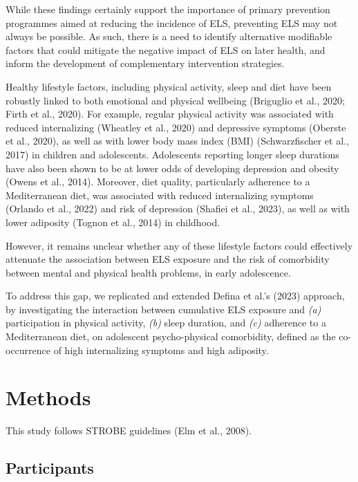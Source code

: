 \documentclass[
  letterpaper,
  DIV=11,
  numbers=noendperiod]{scrreport}
\begin{document}
While these findings certainly support the importance of primary
prevention programmes aimed at reducing the incidence of ELS, preventing
ELS may not always be possible. As such, there is a need to identify
alternative modifiable factors that could mitigate the negative impact
of ELS on later health, and inform the development of complementary
intervention strategies.

Healthy lifestyle factors, including physical activity, sleep and diet
have been robustly linked to both emotional and physical wellbeing
(Briguglio et al., 2020; Firth et al., 2020). For example, regular
physical activity was associated with reduced internalizing (Wheatley et
al., 2020) and depressive symptoms (Oberste et al., 2020), as well as
with lower body mass index (BMI) (Schwarzfischer et al., 2017) in
children and adolescents. Adolescents reporting longer sleep durations
have also been shown to be at lower odds of developing depression and
obesity (Owens et al., 2014). Moreover, diet quality, particularly
adherence to a Mediterranean diet, was associated with reduced
internalizing symptoms (Orlando et al., 2022) and risk of depression
(Shafiei et al., 2023), as well as with lower adiposity (Tognon et al.,
2014) in childhood.

However, it remains unclear whether any of these lifestyle factors could
effectively attenuate the association between ELS exposure and the risk
of comorbidity between mental and physical health problems, in early
adolescence.

To address this gap, we replicated and extended Defina et al.'s (2023)
approach, by investigating the interaction between cumulative ELS
exposure and \emph{(a)} participation in physical activity, \emph{(b)}
sleep duration, and \emph{(c)} adherence to a Mediterranean diet, on
adolescent psycho-physical comorbidity, defined as the co-occurrence of
high internalizing symptoms and high adiposity.

\section{Methods}\label{methods-1}

This study follows STROBE guidelines (Elm et al., 2008).

\subsection{Participants}\label{participants-1}
\end{document}
